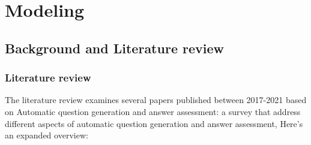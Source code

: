 \chapter{Modeling} 

\section{Background and Literature review}
\label{ch:modeling}

\subsection{Literature review} 

The literature review examines several papers published between 2017-2021 based on Automatic question generation and answer assessment: a survey \cite{das2021automatic} that address different aspects of automatic question generation and answer assessment,   Here's an expanded overview:

